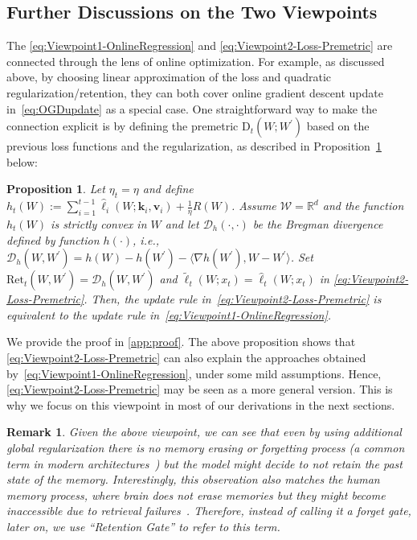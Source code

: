 \documentclass{article}
\newcommand{\citep}{\parencite}
\newcommand{\vk}[0]{\mathbf{k}}
\newcommand{\vvv}[0]{\mathbf{v}}
\newcommand{\cW}[0]{\mathcal{W}}
\newtheorem{remark}{Remark}
\theoremstyle{plain}
\newtheorem{proposition}[theorem]{Proposition}
\theoremstyle{definition}
\theoremstyle{remark}
\begin{document}
\subsection{Further Discussions on the Two Viewpoints}
The \eqref{eq:Viewpoint1-OnlineRegression} and \eqref{eq:Viewpoint2-Loss-Premetric} are connected through the lens of online optimization. For example, as discussed above, by choosing linear approximation of the loss and quadratic regularization/retention, they can both cover online gradient descent update in~\eqref{eq:OGDupdate} as a special case.  One straightforward way to make the connection  explicit is by defining the premetric $\mbox{D}_t(W;W^\prime)$ based on the previous loss functions and the regularization, as described in Proposition~\ref{prop:Viewpoint1Implies2} below:
\begin{proposition}
\label{prop:Viewpoint1Implies2}
 Let $\eta_t = \eta$ and define~$h_t(W) :=  \sum_{i=1}^{t-1} \widehat{\ell}_i (W;\vk_i,\vvv_i) + \frac{1}{\eta}R(W)$. Assume $\cW = \mathbb{R}^d$ and the function $h_t(W)$ is strictly convex in $W$ and let $\mathcal{D}_h(\cdot,\cdot)$ be the Bregman divergence defined by function $h(\cdot)$, i.e., $\mathcal{D}_h(W,W^\prime) = h(W) - h(W^\prime) - \langle \nabla h(W^{\prime}), W-W^{\prime}\rangle$. Set $\mbox{Ret}_t(W,W^\prime) = \mathcal{D}_h(W,W^\prime)$ and $\widetilde{\ell}_t(W;x_t) = \widehat{\ell}_t(W;x_t)$ in \eqref{eq:Viewpoint2-Loss-Premetric}. Then, the update rule in~\eqref{eq:Viewpoint2-Loss-Premetric} is equivalent to the update rule in~\eqref{eq:Viewpoint1-OnlineRegression}. 
\end{proposition} 

We provide the proof in \autoref{app:proof}. The above proposition shows that \eqref{eq:Viewpoint2-Loss-Premetric} can also explain the approaches obtained by~\eqref{eq:Viewpoint1-OnlineRegression}, under some mild assumptions. Hence, \eqref{eq:Viewpoint2-Loss-Premetric} may be seen as a more general version. This is why we focus on this viewpoint in most of our derivations in the next sections. 

\begin{remark}
Given the above viewpoint, we can see that even by using additional global regularization there is no memory erasing or forgetting process (a common term in modern architectures~\citep{behrouz2024titans, yang2024gated}) but the model might decide to not retain the past state of the memory. Interestingly, this observation also matches the human memory process, where brain does not erase memories but they might become inaccessible due to retrieval failures~\citep{robertson2002memory}. Therefore, instead of calling it a forget gate, later on, we use ``Retention Gate'' to refer to this term.  
\end{remark}
\end{document}
